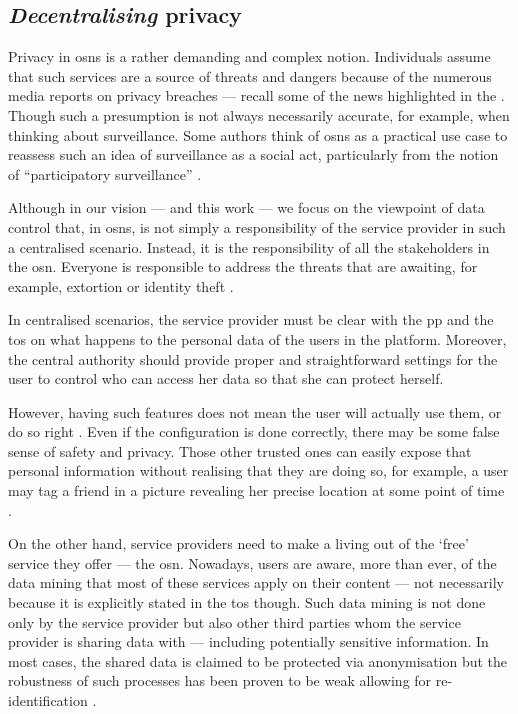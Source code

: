 \subsection{\emph{Decentralising} privacy}
    \label{subsection:thesis:decentralising-privacy}
Privacy in \acp{osn} is a rather demanding and complex notion. Individuals assume 
that such services are a source of threats and dangers because of the numerous media 
reports on privacy breaches --- recall some of the news highlighted in the  
. Though such a presumption is not always necessarily 
accurate, for example, when thinking about surveillance. Some authors think of \acp{osn} 
as a practical use case to reassess such an idea of surveillance as a social act, 
particularly from the notion of ``participatory surveillance'' \cite{Albrechtslund08}.

Although in our vision --- and this work --- we focus on the viewpoint of data control 
that, in \acp{osn}, is not simply a responsibility of the service provider in such 
a centralised scenario. Instead, it is the responsibility of all the stakeholders 
in the \ac{osn}. Everyone is responsible to address the threats that are awaiting, 
for example, extortion or identity theft \cite{GrossAH05}. 

In centralised scenarios, the service provider must be clear with the \ac{pp} and 
the \ac{tos} on what happens to the personal data of the users in the platform. 
Moreover, the central authority should provide proper and straightforward settings 
for the user to control who can access her data so that she can protect herself. 

However, having such features does not mean the user will actually use them, or   
do so right \cite{KrishnamurthyW08, BrandtzaegLS10}. Even if the configuration is 
done correctly, there may be some false sense of safety and privacy. Those other 
trusted ones can easily expose that personal information without realising that 
they are doing so, for example, a user may tag a friend in a picture revealing her 
precise location at some point of time \cite{ZhelevaG09, SmithSHV12}. 

On the other hand, service providers need to make a living out of the `free' service
they offer --- the \ac{osn}. Nowadays, users are aware, more than ever, of the data 
mining that most of these services apply on their content --- not necessarily because 
it is explicitly stated in the \ac{tos} though. Such data mining is not done only 
by the service provider but also other third parties whom the service provider is 
sharing data with --- including potentially sensitive information. In most cases, 
the shared data is claimed to be protected via anonymisation but the robustness 
of such processes has been proven to be weak allowing for re-identification \cite{NarayananS09}.

